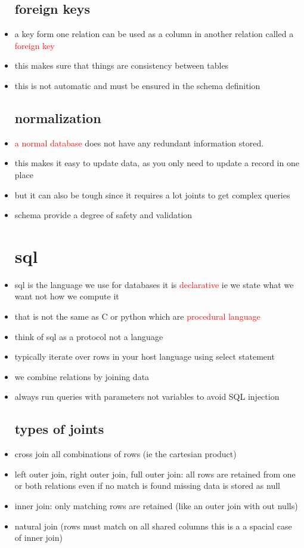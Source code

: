 \documentclass{article}
\begin{document}
\begin{itemize}
\subsection*{foreign keys}
\item a key form one relation can be used as a column in another relation called a \textcolor{red}{foreign key}
\item this makes sure that things are consistency between tables
\item this is not automatic and must be ensured in the schema definition 
\subsection*{normalization}
\item \textcolor{red}{a normal database} does not have any redundant information stored.
\item this makes it easy to update data, as you only need to update a record in one place
\item but it can also be tough since it requires a lot joints to get complex queries
\item schema provide a degree of safety and validation 
\section*{sql}
\item sql is the language we use for databases it is \textcolor{red}{declarative} ie we state what we want not how we compute it 
\item that is not the same as C or python which are \textcolor{red}{procedural language} 
\item think of sql as a protocol not a language
\item typically iterate over rows in your host language using select statement 
\item we combine relations by joining data 
\item always run queries with parameters not variables to avoid SQL injection  
\subsection*{types of joints}
\item cross join all combinations of rows (ie the cartesian product)
\item left outer join, right outer join, full  outer join: all rows are retained from one or both relations even if no match is found missing data is stored as null
\item inner join: only matching rows are retained (like an outer join with out nulls)
\item natural join (rows must match on all shared columns this is a a spacial case of inner join)


\end{itemize}
\end{document}
